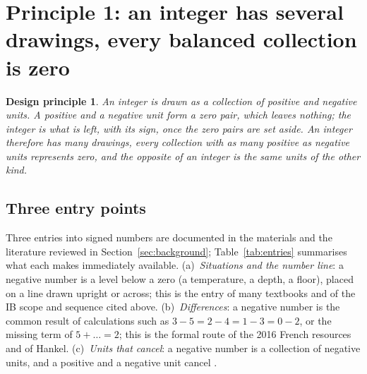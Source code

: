 \documentclass[11pt,a4paper]{article}
\newtheorem{principle}{Design principle}
\theoremstyle{definition}
\begin{document}
\section{Principle 1: an integer has several drawings, every balanced collection is zero}\label{sec:p1}

\begin{principle}
An integer is drawn as a collection of positive and negative units. A positive and a negative unit form a zero pair, which leaves nothing; the integer is what is left, with its sign, once the zero pairs are set aside. An integer therefore has many drawings, every collection with as many positive as negative units represents zero, and the opposite of an integer is the same units of the other kind.
\end{principle}

\subsection{Three entry points}
Three entries into signed numbers are documented in the materials and the literature reviewed in Section~\ref{sec:background}; Table~\ref{tab:entries} summarises what each makes immediately available. (a)~\emph{Situations and the number line}: a negative number is a level below a zero (a temperature, a depth, a floor), placed on a line drawn upright or across; this is the entry of many textbooks and of the IB scope and sequence cited above. (b)~\emph{Differences}: a negative number is the common result of calculations such as $3-5=2-4=1-3=0-2$, or the missing term of $5+\ldots=2$; this is the formal route of the 2016 French resources and of Hankel. (c)~\emph{Units that cancel}: a negative number is a collection of negative units, and a positive and a negative unit cancel \citep{Janvier1985,Battista1983,Liebeck1990}.
\end{document}
